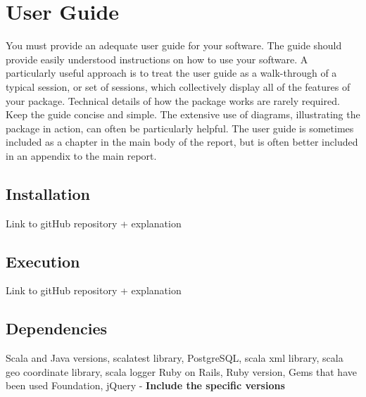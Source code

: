 \chapter{User Guide}
You must provide an adequate user guide for your software. The guide should provide easily understood instructions on how to use your software. A particularly useful approach is to treat the user guide as a walk-through of a typical session, or set of sessions, which collectively display all of the features of your package. Technical details of how the package works are rarely required. Keep the guide concise and simple. The extensive use of diagrams, illustrating the package in action, can often be particularly helpful. The user guide is sometimes included as a chapter in the main body of the report, but is often better included in an appendix to the main report.
\section{Installation}
Link to gitHub repository + explanation
\section{Execution}
Link to gitHub repository + explanation
\section{Dependencies}
Scala and Java versions, scalatest library, PostgreSQL, scala xml library, scala geo coordinate library, scala logger
Ruby on Rails, Ruby version, Gems that have been used
Foundation, jQuery - \textbf{Include the specific versions}